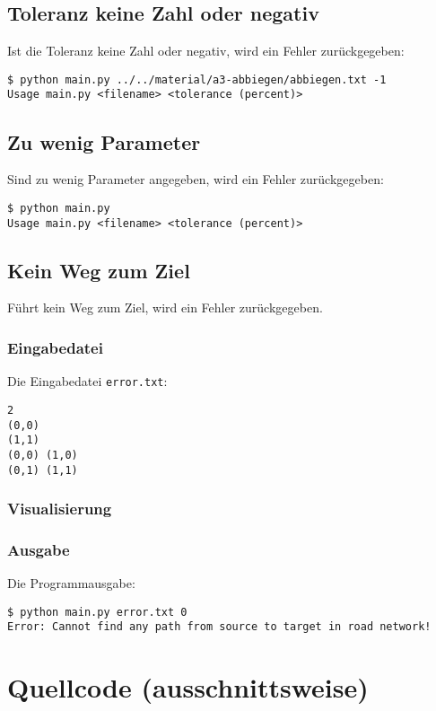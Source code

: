 \documentclass[a4paper,10pt,ngerman]{scrartcl}
\begin{document}
\subsection{Toleranz keine Zahl oder negativ}
Ist die Toleranz keine Zahl oder negativ, wird ein Fehler zurückgegeben:
\begin{lstlisting}
$ python main.py ../../material/a3-abbiegen/abbiegen.txt -1
Usage main.py <filename> <tolerance (percent)>
\end{lstlisting}

\subsection{Zu wenig Parameter}
Sind zu wenig Parameter angegeben, wird ein Fehler zurückgegeben:
\begin{lstlisting}
$ python main.py
Usage main.py <filename> <tolerance (percent)>
\end{lstlisting}

\subsection{Kein Weg zum Ziel}
Führt kein Weg zum Ziel, wird ein Fehler zurückgegeben.

\subsubsection{Eingabedatei}
Die Eingabedatei \texttt{error.txt}:
\begin{lstlisting}
2
(0,0)
(1,1)
(0,0) (1,0)
(0,1) (1,1)
\end{lstlisting}

\subsubsection{Visualisierung}


\subsubsection{Ausgabe}
Die Programmausgabe:
\begin{lstlisting}
$ python main.py error.txt 0
Error: Cannot find any path from source to target in road network!
\end{lstlisting}

\section{Quellcode (ausschnittsweise)}

\listoftodos


\printbibliography
\end{document}
